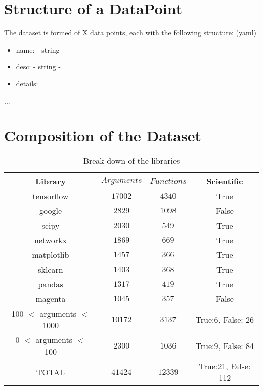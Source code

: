 
\section{Structure of a DataPoint} %
\label{sec:structure_of_datapoint}

The dataset is formed of X data points, each with the following structure: (yaml)
\begin{itemize}
    \item name: - string - 
    \item desc: - string - 
    \item details: 

\end{itemize}
...



\section{Composition of the Dataset} %
\label{sec:composition_of_the_dataset}


\begin{table}[h!]
\begin{center}
\begin{tabular}{c | c | c | c }
    Library      & $ Arguments $     & $ Functions $ & Scientific \\
\hline
    tensorflow   & $ 17002 $     & $ 4340 $ & True \\
    google   & $ 2829 $      & $ 1098 $ & False \\
    scipy    & $ 2030 $      & $ 549 $ & True \\
    networkx     & $ 1869 $      & $ 669 $ & True \\
    matplotlib   & $ 1457 $      & $ 366 $ & True \\
    sklearn      & $ 1403 $      & $ 368 $ & True \\
    pandas   & $ 1317 $      & $ 419 $ & True \\
    magenta      & $ 1045 $      & $ 357 $ & False \\
    100 $<$ arguments $<$ 1000   & $ 10172 $     & $ 3137 $ & True:6, False: 26 \\
    0 $<$ arguments $<$ 100      & $ 2300 $      & $ 1036 $ & True:9, False: 84 \\
\hline
\hline
    TOTAL    & $ 41424 $     & $ 12339 $ & True:21, False: 112 \\
\end{tabular}
\caption {Break down of the libraries}
\label{table:split_datasets_embed}
\end{center}
\end{table}
